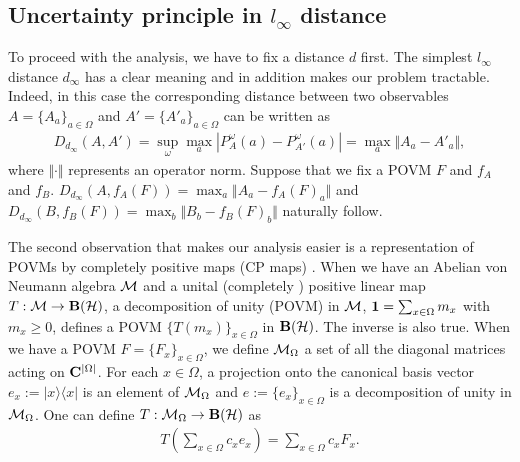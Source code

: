 \documentclass[showpacs,preprintnumbers,amsmath,amssymb]{revtex4}
\begin{document}
 \subsection{Uncertainty principle in $l_{\infty}$ distance}
 To proceed with the analysis, we have to fix a distance $d$ first. 
 The simplest $l_{\infty}$ distance $d_{\infty}$ has a clear 
meaning and in addition makes 
 our problem tractable. Indeed, in this case the corresponding 
 distance between two observables $A=\{A_a\}_{a\in \Omega}$ 
 and $A'=\{A'_a\}_{a\in \Omega}$ 
 can be written as \cite{Heinosaari}
 \begin{eqnarray*}
 D_{d_{\infty}}(A,A')
 =\sup_{\omega} \max_{a} |P^{\omega}_A(a)-
 P^{\omega}_{A'}(a)|
 =\max_a \Vert A_a -A'_a\Vert,
 \end{eqnarray*}
 where $\Vert\cdot \Vert$ represents an operator norm. 
Suppose that we fix a POVM $F$ and $f_A$ and $f_B$. 
$D_{d_{\infty}}(A,f_A(F))
=\max_a \Vert A_a-f_A(F)_a\Vert$ and 
$D_{d_{\infty}}(B,f_B(F))
=\max_b \Vert B_b-f_B(F)_b\Vert$ naturally follow. 
\par
The second observation that makes our analysis easier is a 
representation of POVMs by completely positive maps (CP maps)
\cite{JanssensMaster}. 
When we have an Abelian von Neumann algebra ${\cal M}$ and a 
unital (completely \cite{completely})
 positive linear map $T:{\cal M} \to {\bf B}({\cal H})$, 
a decomposition of unity (POVM) 
in ${\cal M}$, ${\bf 1}=\sum_{x \in \Omega}m_x$ 
with $m_x \geq 0$, defines a POVM $\{T(m_x)\}_{x\in \Omega}$ in
${\bf B}({\cal H})$. 
The inverse is also true. 
When we have a POVM $F=\{F_x\}_{x\in \Omega}$, 
we define ${\cal M}_{\Omega}$ a set of all the diagonal 
matrices acting on ${\bf C}^{|\Omega|}$. 
For each $x\in \Omega$, 
a projection onto the canonical basis vector
$e_x:=|x\rangle \langle x|$ 
is an 
element of ${\cal M}_{\Omega}$ and $e:=\{e_x\}_{x\in \Omega}$ 
is a decomposition of unity in ${\cal M}_{\Omega}$.  
One can define $T:{\cal M}_{\Omega} \to {\bf B}({\cal H})$ 
as 
\begin{eqnarray*}
T(\sum_{x\in \Omega}c_x e_x)
=\sum_{x\in \Omega}c_x F_x.
\end{eqnarray*}
\end{document}
